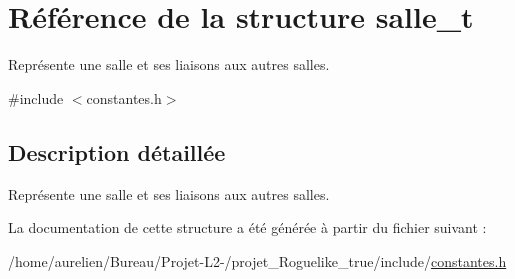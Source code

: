 \hypertarget{structsalle__t}{}\section{Référence de la structure salle\+\_\+t}
\label{structsalle__t}


Représente une salle et ses liaisons aux autres salles.  




{\ttfamily \#include $<$constantes.\+h$>$}



\subsection{Description détaillée}
Représente une salle et ses liaisons aux autres salles. 

La documentation de cette structure a été générée à partir du fichier suivant \+:\begin{DoxyCompactItemize}
\item 
/home/aurelien/\+Bureau/\+Projet-\/\+L2-\//projet\+\_\+\+Roguelike\+\_\+true/include/\hyperlink{constantes_8h}{constantes.\+h}\end{DoxyCompactItemize}
